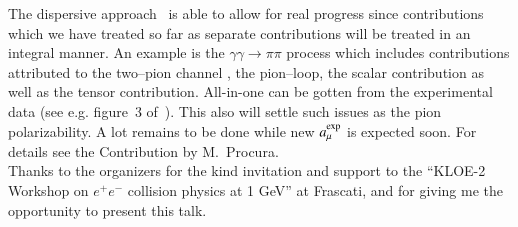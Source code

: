 \documentclass[epj,onecolumn]{webofc}
\begin{document}
The dispersive approach~\cite{PaukVanderhaeghen2013,Colangelo:2014pva}
is able to allow for real progress since contributions which we have
treated so far as separate contributions will be treated in an
integral manner. An example is the $\gamma \gamma \to
\pi\pi$ process which includes contributions attributed to the two--pion channel
, the pion--loop, the scalar contribution as well as the tensor
contribution. All-in-one can be gotten from the experimental data (see
e.g. figure~3 of~\cite{Jegerlehner:2013sja}). This also will settle such issues
as the pion polarizability. A lot remains to be done while new $a^{\rm
exp}_\mu$ is expected soon. For details see the Contribution by M.~Procura.\\

\acknowledgement
Thanks to the organizers for the kind invitation and support to the
``KLOE-2 Workshop on $e^+e^-$ collision physics at 1 GeV'' at
Frascati, and for giving me the opportunity to present this talk.
\end{document}
